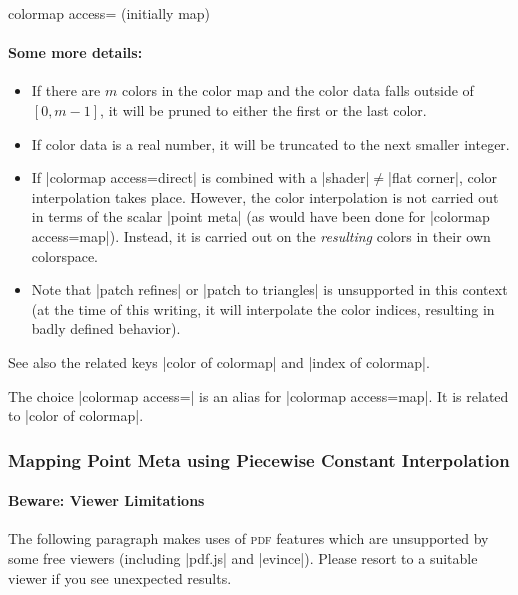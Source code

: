 \begin{pgfplotskey}{colormap access= (initially map)}
	\paragraph{Some more details:}
	\begin{itemize}
		\item If there are $m$ colors in the color map and the color data falls outside of $[0,m-1]$, it will be pruned to either the first or the last color.
		\item If color data is a real number, it will be truncated to the next smaller integer.
		\item If |colormap access=direct| is combined with a |shader|$\neq$|flat corner|, color interpolation takes place. However, the color interpolation is not carried out in terms of the scalar |point meta| (as would have been done for |colormap access=map|). Instead, it is carried out on the \emph{resulting} colors in their own colorspace. 

		\item Note that |patch refines| or |patch to triangles| is unsupported in this context (at the time of this writing, it will interpolate the color indices, resulting in badly defined behavior).

	\end{itemize}

	See also the related keys |color of colormap| and |index of colormap|.

	
	The choice |colormap access=| is an alias for |colormap access=map|. It is related to |color of colormap|.

	\subsubsection{Mapping Point Meta using Piecewise Constant Interpolation}
	
	\paragraph{Beware: Viewer Limitations} The following paragraph makes uses of \textsc{pdf} features which are unsupported by some free viewers (including |pdf.js| and |evince|). Please resort to a suitable viewer if you see unexpected results.


\end{pgfplotskey}
